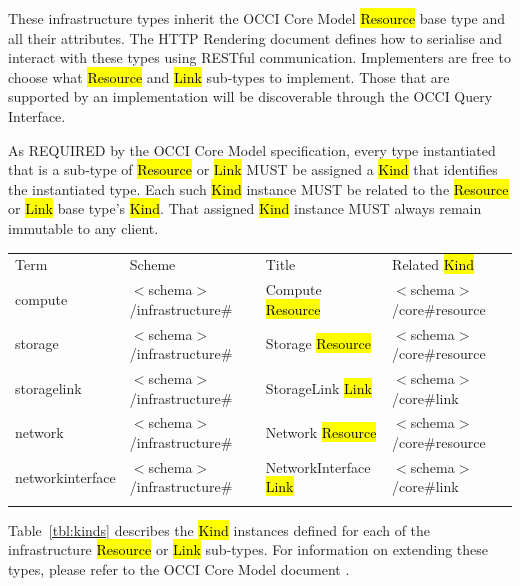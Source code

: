 \documentclass[10pt,a4paper]{article}
\begin{document}
These infrastructure types inherit the OCCI Core Model \hl{Resource}
base type and all their attributes. The HTTP Rendering document
\cite{occi:http_rendering} defines how to serialise and interact with
these types using RESTful communication. Implementers are free to
choose what \hl{Resource} and \hl{Link} sub-types to implement. Those
that are supported by an implementation will be discoverable through
the OCCI Query Interface.

As REQUIRED by the OCCI Core Model specification, every type
instantiated that is a sub-type of \hl{Resource} or \hl{Link} MUST be
assigned a \hl{Kind} that identifies the instantiated type. Each such
\hl{Kind} instance MUST be related to the \hl{Resource} or \hl{Link}
base type's \hl{Kind}.  That assigned \hl{Kind} instance MUST always
remain immutable to any client.

 {
	\begin{tabular}{llll}
	\toprule
	Term & Scheme & Title & Related \hl{Kind} \\
	\colrule
	compute &  $<$schema$>$/infrastructure\# & Compute \hl{Resource}
	& $<$schema$>$/core\#resource \\
	
	storage & $<$schema$>$/infrastructure\# & Storage \hl{Resource}
	& $<$schema$>$/core\#resource \\
	
	storagelink & $<$schema$>$/infrastructure\# & StorageLink \hl{Link}
	& $<$schema$>$/core\#link \\
	
	network & $<$schema$>$/infrastructure\# & Network \hl{Resource}
	& $<$schema$>$/core\#resource \\
	
	networkinterface & $<$schema$>$/infrastructure\# & NetworkInterface \hl{Link}
	& $<$schema$>$/core\#link \\
	
	\botrule
	\end{tabular}
}

Table~\ref{tbl:kinds} describes the \hl{Kind} instances defined for
each of the infrastructure \hl{Resource} or \hl{Link} sub-types. For
information on extending these types, please refer to the OCCI Core
Model document \cite{occi:core}.
\end{document}
